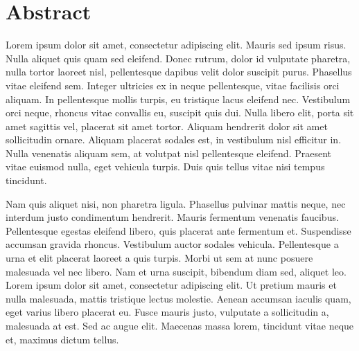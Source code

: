 \chapter*{Abstract}

Lorem ipsum dolor sit amet, consectetur adipiscing elit.
Mauris sed ipsum risus.
Nulla aliquet quis quam sed eleifend.
Donec rutrum, dolor id vulputate pharetra, nulla tortor laoreet nisl,
pellentesque dapibus velit dolor suscipit purus.
Phasellus vitae eleifend sem.
Integer ultricies ex in neque pellentesque, vitae facilisis orci aliquam.
In pellentesque mollis turpis, eu tristique lacus eleifend nec.
Vestibulum orci neque, rhoncus vitae convallis eu, suscipit quis dui.
Nulla libero elit, porta sit amet sagittis vel, placerat sit amet tortor.
Aliquam hendrerit dolor sit amet sollicitudin ornare.
Aliquam placerat sodales est, in vestibulum nisl efficitur in.
Nulla venenatis aliquam sem, at volutpat nisl pellentesque eleifend.
Praesent vitae euismod nulla, eget vehicula turpis.
Duis quis tellus vitae nisi tempus tincidunt.

Nam quis aliquet nisi, non pharetra ligula.
Phasellus pulvinar mattis neque, nec interdum justo condimentum hendrerit.
Mauris fermentum venenatis faucibus.
Pellentesque egestas eleifend libero, quis placerat ante fermentum et.
Suspendisse accumsan gravida rhoncus.
Vestibulum auctor sodales vehicula.
Pellentesque a urna et elit placerat laoreet a quis turpis.
Morbi ut sem at nunc posuere malesuada vel nec libero.
Nam et urna suscipit, bibendum diam sed, aliquet leo.
Lorem ipsum dolor sit amet, consectetur adipiscing elit.
Ut pretium mauris et nulla malesuada, mattis tristique lectus molestie.
Aenean accumsan iaculis quam, eget varius libero placerat eu.
Fusce mauris justo, vulputate a sollicitudin a, malesuada at est.
Sed ac augue elit.
Maecenas massa lorem, tincidunt vitae neque et, maximus dictum tellus.
